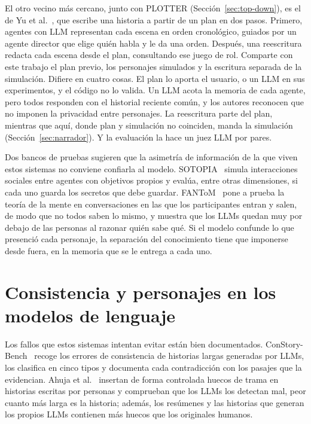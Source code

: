 El otro vecino más cercano, junto con PLOTTER (Sección~\ref{sec:top-down}), es el de Yu
et al.~\cite{yu2025}, que escribe una historia a partir de un plan en dos pasos. Primero, agentes con
LLM representan cada escena en orden cronológico, guiados por un agente director que elige quién
habla y le da una orden. Después, una reescritura redacta cada escena desde el plan, consultando ese
juego de rol. Comparte con este trabajo el plan previo, los personajes simulados y la escritura
separada de la simulación. Difiere en cuatro cosas. El plan lo aporta el usuario, o un LLM en sus
experimentos, y el código no lo valida. Un LLM acota la memoria de cada agente, pero todos responden
con el historial reciente común, y los autores reconocen que no imponen la privacidad entre
personajes. La reescritura parte del plan, mientras que aquí, donde plan y simulación no coinciden,
manda la simulación (Sección~\ref{sec:narrador}). Y la evaluación la hace un juez LLM por pares.

Dos bancos de pruebas sugieren que la asimetría de información de la que viven estos sistemas no
conviene confiarla al modelo. SOTOPIA~\cite{zhou2024} simula interacciones sociales entre agentes con
objetivos propios y evalúa, entre otras dimensiones, si cada uno guarda los secretos que debe
guardar. FANToM~\cite{kim2023} pone a prueba la teoría de la mente en conversaciones en las que los
participantes entran y salen, de modo que no todos saben lo mismo, y muestra que los LLMs quedan muy
por debajo de las personas al razonar quién sabe qué. Si el modelo confunde lo que presenció cada
personaje, la separación del conocimiento tiene que imponerse desde fuera, en la memoria que se le
entrega a cada uno.

\section{Consistencia y personajes en los modelos de lenguaje}\label{sec:consistencia}

Los fallos que estos sistemas intentan evitar están bien documentados. ConStory-Bench~\cite{li2026}
recoge los errores de consistencia de historias largas generadas por LLMs, los clasifica en cinco
tipos y documenta cada contradicción con los pasajes que la evidencian. Ahuja et
al.~\cite{ahuja2025} insertan de forma controlada huecos de trama en historias escritas por personas
y comprueban que los LLMs los detectan mal, peor cuanto más larga es la historia; además, los
resúmenes y las historias que generan los propios LLMs contienen más huecos que los originales
humanos.

